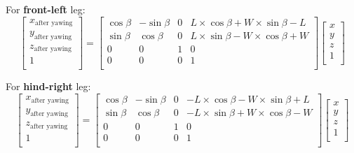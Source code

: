 For \textbf{front-left} leg:
\begin{equation}
   \begin{bmatrix}
   x_\text{after yawing} \\
   y_\text{after yawing} \\
   z_\text{after yawing} \\
   1                     \\
   \end{bmatrix}
   =
   \begin{bmatrix}
   \cos\beta & -\sin\beta & 0 & L \times \cos\beta + W \times \sin\beta - L \\
   \sin\beta & \cos\beta & 0 & L \times \sin\beta - W \times \cos\beta + W \\
   0 & 0 & 1 & 0 \\
   0 & 0 & 0 & 1 \\
   \end{bmatrix}
   \begin{bmatrix}
   x \\
   y \\
   z \\
   1 \\
   \end{bmatrix}
\end{equation}

For \textbf{hind-right} leg:
\begin{equation}
   \begin{bmatrix}
   x_\text{after yawing} \\
   y_\text{after yawing} \\
   z_\text{after yawing} \\
   1                     \\
   \end{bmatrix}
   =
   \begin{bmatrix}
   \cos\beta & -\sin\beta & 0 & -L \times \cos\beta - W \times \sin\beta + L \\
   \sin\beta & \cos\beta & 0 & -L \times \sin\beta + W \times \cos\beta - W \\
   0 & 0 & 1 & 0 \\
   0 & 0 & 0 & 1 \\
   \end{bmatrix}
   \begin{bmatrix}
   x \\
   y \\
   z \\
   1 \\
   \end{bmatrix}
\end{equation}

